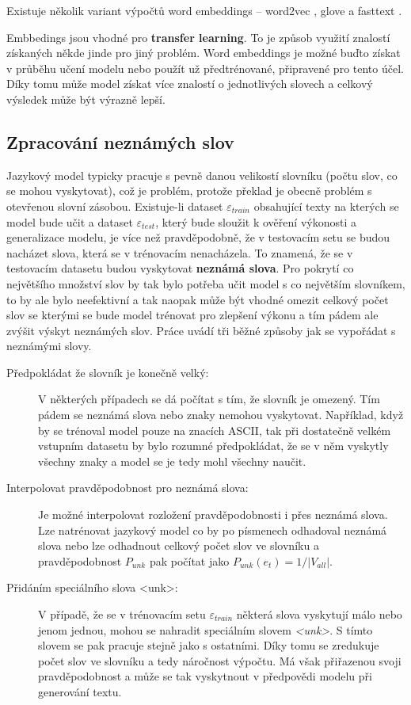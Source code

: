 Existuje několik variant výpočtů word embeddings -- word2vec \cite{word2vec}, glove \cite{glove} a fasttext \cite{fasttext}.


Embbedings jsou vhodné pro \textbf{transfer learning}. To je způsob využití znalostí získaných někde jinde pro jiný problém. Word embeddings je možné buďto získat v průběhu učení modelu nebo použít už předtrénované, připravené pro tento účel. Díky tomu může model získat více znalostí o jednotlivých slovech a celkový výsledek může být výrazně lepší.

\subsection{Zpracování neznámých slov} \label{subsection:oov}
Jazykový model typicky pracuje s pevně danou velikostí slovníku (počtu slov, co se mohou vyskytovat), což je problém, protože překlad je obecně problém s otevřenou slovní zásobou. Existuje-li dataset $\varepsilon_{train}$ obsahující texty na kterých se model bude učit a dataset $\varepsilon_{test}$, který bude sloužit k ověření výkonosti a generalizace modelu, je více než pravděpodobně, že v testovacím setu se budou nacházet slova, která se v trénovacím nenacházela. To znamená, že se v testovacím datasetu budou vyskytovat \textbf{neznámá slova}. Pro pokrytí co největšího množství slov by tak bylo potřeba učit model s co největším slovníkem, to by ale bylo neefektivní a tak naopak může být vhodné omezit celkový počet slov se kterými se bude model trénovat pro zlepšení výkonu a tím pádem ale zvýšit výskyt neznámých slov. Práce \cite{nmtTutorial} uvádí tři běžné způsoby jak se vypořádat s neznámými slovy.

\begin{description}
  \item[Předpokládat že slovník je konečně velký:] V některých případech se dá počítat s tím, že slovník je omezený. Tím pádem se neznámá slova nebo znaky nemohou vyskytovat. Například, když by se trénoval model pouze na znacích ASCII, tak při dostatečně velkém vstupním datasetu by bylo rozumné předpokládat, že se v něm vyskytly všechny znaky a model se je tedy mohl všechny naučit.
  \item[Interpolovat pravděpodobnost pro neznámá slova:] Je možné interpolovat rozložení pravděpodobnosti i přes neznámá slova. Lze natrénovat jazykový model co by po písmenech odhadoval neznámá slova nebo lze odhadnout celkový počet slov ve slovníku a pravděpodobnost $P_{unk}$ pak počítat jako $P_{unk}(e_t) = 1/|V_{all}|$.
  \item[Přidáním speciálního slova <unk>:]\label{description:unk}V případě, že se v trénovacím setu $\varepsilon_{train}$ některá slova vyskytují málo nebo jenom jednou, mohou se nahradit speciálním slovem \emph{<unk>}. S tímto slovem se pak pracuje stejně jako s ostatními. Díky tomu se zredukuje počet slov ve slovníku a tedy náročnost výpočtu. Má však přiřazenou svoji pravděpodobnost a může se tak vyskytnout v předpovědi modelu při generování textu.
\end{description}


